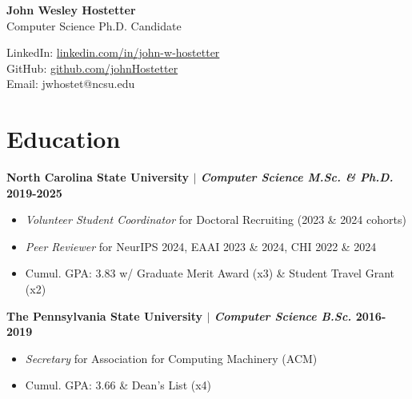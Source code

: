 \documentclass[11pt]{article} %
\begin{document}
\begin{center}
	\begin{minipage}{0.5\textwidth}
		{\LARGE\bfseries
			John Wesley Hostetter %
		} \\ \medskip
		Computer Science Ph.D. Candidate %
	\end{minipage} \hfill
	\begin{minipage}{0.475\textwidth}
		\raggedleft
        \small
		LinkedIn: \href{https://www.linkedin.com/in/john-w-hostetter/}{linkedin.com/in/john-w-hostetter} \\
		GitHub: \href{https://github.com/johnHostetter}{github.com/johnHostetter} \\
		Email: jwhostet@ncsu.edu
    \end{minipage}
\end{center}

\vspace{-24pt}



\vspace{-20pt}
\section{Education}
\vspace{-8pt}

\noindent\textbf{North Carolina State University $|$ {\normalfont\itshape Computer Science M.Sc. \& Ph.D.} \hfill 2019-2025}
\vspace{-6pt}
\begin{itemize}
\setlength\itemsep{-0.5em}
    \item \textit{Volunteer Student Coordinator} for Doctoral Recruiting (2023 \& 2024 cohorts)
    \item \textit{Peer Reviewer} for NeurIPS 2024, EAAI 2023 \& 2024, CHI 2022 \& 2024
    \item Cumul. GPA: 3.83 w/ Graduate Merit Award (x3) \& Student Travel Grant (x2)
\end{itemize}

\vspace{-4pt}

\noindent\textbf{The Pennsylvania State University $|$ {\normalfont\itshape Computer Science B.Sc.} \hfill 2016-2019}
\vspace{-6pt}
\begin{itemize}
    \setlength\itemsep{-0.5em}
    \item \textit{Secretary} for Association for Computing Machinery (ACM)
    \item Cumul. GPA: 3.66 \& Dean's List (x4)
\end{itemize}
\end{document}
